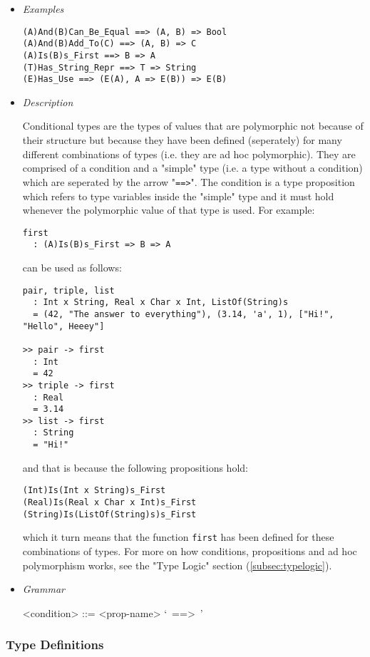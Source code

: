 \documentclass{article}
\begin{document}
\begin{itemize}
\item \textit{Examples}
\begin{verbatim}
(A)And(B)Can_Be_Equal ==> (A, B) => Bool
(A)And(B)Add_To(C) ==> (A, B) => C
(A)Is(B)s_First ==> B => A
(T)Has_String_Repr ==> T => String
(E)Has_Use ==> (E(A), A => E(B)) => E(B)
\end{verbatim}

\item \textit{Description}

Conditional types are the types of values that are polymorphic not because of
their structure but because they have been defined (seperately) for many
different combinations of types (i.e. they are ad hoc polymorphic). They are
comprised of a condition and a "simple" type (i.e. a type without a
condition) which are seperated by the arrow "\texttt{==>}". The condition is a
type proposition which refers to type variables inside the "simple" type
and it must hold whenever the polymorphic value of that type is used. For
example:
\begin{verbatim}
first
  : (A)Is(B)s_First => B => A
\end{verbatim}
can be used as follows:
\begin{verbatim}
pair, triple, list
  : Int x String, Real x Char x Int, ListOf(String)s
  = (42, "The answer to everything"), (3.14, 'a', 1), ["Hi!", "Hello", Heeey"]

>> pair -> first
  : Int
  = 42
>> triple -> first
  : Real
  = 3.14
>> list -> first
  : String
  = "Hi!"
\end{verbatim}
and that is because the following propositions hold:
\begin{verbatim}
(Int)Is(Int x String)s_First
(Real)Is(Real x Char x Int)s_First
(String)Is(ListOf(String)s)s_First
\end{verbatim}
which it turn means that the function \texttt{first} has been defined
for these combinations of types. For more on how conditions, propositions and
ad hoc polymorphism works, see the "Type Logic" section (\ref{subsec:typelogic}).

\item \textit{Grammar}
\begin{grammar}
<condition> ::= <prop-name> `\ ==>\ ' 
\end{grammar}

\end{itemize}

\subsubsection{Type Definitions}
\label{subsubsec:tdefs}
\end{document}
